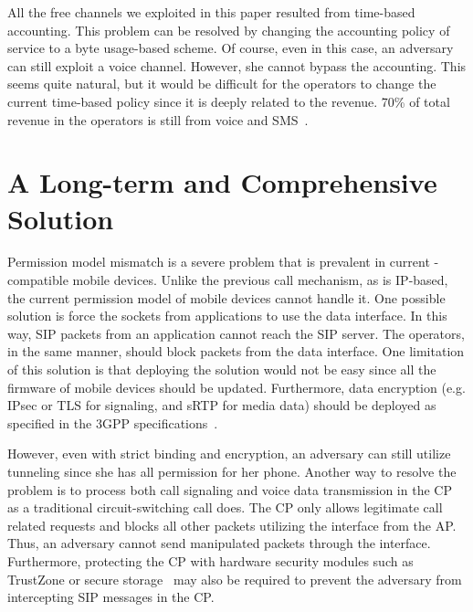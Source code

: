 All the free channels we exploited in this paper resulted from
time-based accounting. This problem can be resolved by changing the
accounting policy of \vt service to a byte usage-based scheme. Of
course, even in this case, an adversary can still exploit a voice
channel. However, she cannot bypass the accounting. This seems quite
natural, but it would be difficult for the operators to change the
current time-based policy since it is deeply related to the
revenue. 70\% of total revenue in the operators is still from 
voice and SMS~\cite{Ericsson_press}.


\section{A Long-term and Comprehensive Solution}
Permission model mismatch is a severe problem that is prevalent in current
\vt-compatible mobile devices. Unlike the previous call mechanism, as \vt is
IP-based, the current permission model of mobile devices cannot handle it. One
possible solution is force the sockets from applications to use the data
interface.  In this way, SIP packets from an application cannot reach the SIP
server. The operators, in the same manner, should block packets from the data
interface. One limitation of this solution is that deploying the solution would
not be easy since all the firmware of mobile devices should be updated.
Furthermore, data encryption (e.g. IPsec or TLS for signaling, and sRTP for
media data) should be deployed as specified in the 3GPP
specifications~\cite{3gpp_net_sec, 3gpp_access_sec}.

However, even with strict binding and encryption, an adversary can still utilize
tunneling since she has all permission for her phone.  Another way to resolve
the problem is to process both call signaling and voice data transmission in the
CP as a traditional circuit-switching call does.  The CP only allows legitimate
call related requests and blocks all other packets utilizing the \vt interface
from the AP. Thus, an adversary cannot send manipulated packets through the \vt
interface. Furthermore, protecting the CP with hardware security modules such as
TrustZone or secure storage~\cite{alves2004trustzone} may also be required to
prevent the adversary from intercepting SIP messages in the CP.

